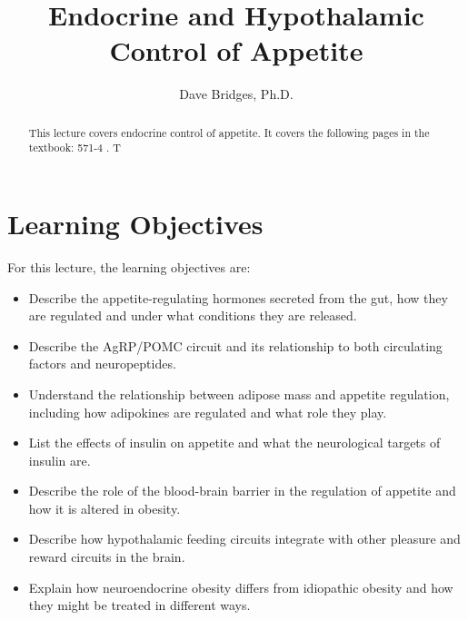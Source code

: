 \documentclass{tufte-handout}
\title{Endocrine and Hypothalamic Control of Appetite}
\author{Dave Bridges, Ph.D.}
\begin{document}
\maketitle%

\begin{abstract}
\noindent This lecture covers endocrine control of appetite.  It covers the following pages in the textbook: 571-4 \cite{Widmaier2013}.  T
\end{abstract}

\tableofcontents

\pagebreak

\section{Learning Objectives}
For this lecture, the learning objectives are:
\begin{itemize}
\item Describe the appetite-regulating hormones secreted from the gut, how they are regulated and under what conditions they are released.
\item Describe the AgRP/POMC circuit and its relationship to both circulating factors and neuropeptides.
\item Understand the relationship between adipose mass and appetite regulation, including how adipokines are regulated and what role they play.
\item List the effects of insulin on appetite and what the neurological targets of insulin are.
\item Describe the role of the blood-brain barrier in the regulation of appetite and how it is altered in obesity.
\item Describe how hypothalamic feeding circuits integrate with other pleasure and reward circuits in the brain.
\item Explain how neuroendocrine obesity differs from idiopathic obesity and how they might be treated in different ways.

\end{itemize}



\listoffigures
\listoftables



\end{document}
